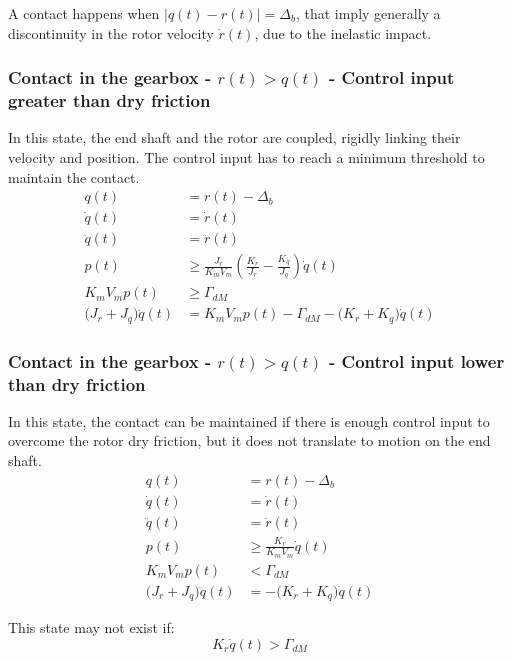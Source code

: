 \documentclass[english,12pt,a4paper]{article}
\begin{document}
			A contact happens when $\big|q(t)-r(t)\big| = \Delta_b$, that imply generally a discontinuity in the rotor velocity $\dot{r}(t)$, due to the inelastic impact.
			
			
		\subsubsection{Contact in the gearbox - $r(t)>q(t)$ - Control input greater than dry friction}
			In this state, the end shaft and the rotor are coupled, rigidly linking their velocity and position. The control input has to reach a minimum threshold to maintain the contact.
			\begin{align}
				q(t) &= r(t) - \Delta_b \\
				\dot{q}(t) &= \dot{r}(t) \\
				\ddot{q}(t) &= \ddot{r}(t) \\
				p(t) &\ge \frac{J_r}{K_m V_m} \left( \frac{K_r}{J_r} - \frac{K_q}{J_q} \right) \dot{q}(t) \\
				K_mV_mp(t) &\ge \Gamma_{dM} \\
				\big( J_r + J_q \big) \ddot{q}(t) &= K_mV_mp(t) - \Gamma_{dM} - \big(K_r+K_q\big)\dot{q}(t)
			\end{align}
	
	
		\subsubsection{Contact in the gearbox - $r(t)>q(t)$ - Control input lower than dry friction}
			In this state, the contact can be maintained if there is enough control input to overcome the rotor dry friction, but it does not translate to motion on the end shaft.
			\begin{align}
				q(t) &= r(t) - \Delta_b \\
				\dot{q}(t) &= \dot{r}(t) \\
				\ddot{q}(t) &= \ddot{r}(t) \\
				p(t) &\ge \frac{K_r}{K_m V_m} \dot{q}(t) \\
				K_mV_mp(t) &< \Gamma_{dM} \\
				\big( J_r + J_q \big) \ddot{q}(t) &= - \big(K_r+K_q\big)\dot{q}(t)
			\end{align}
			
			This state may not exist if:
			\begin{equation}
				K_r \dot{q}(t) > \Gamma_{dM}
			\end{equation}
			
\end{document}
